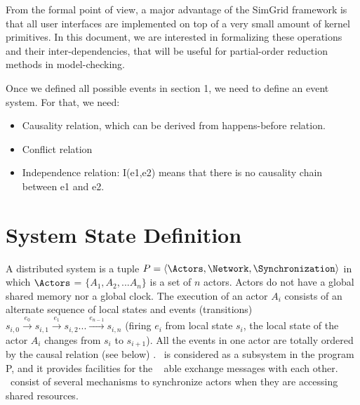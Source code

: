 \documentclass[a4paper,11pt]{article}
\newcommand{\TJ}[1]{\todo[color=green!50]{\sf \textbf{TJ:} #1}}
\begin{document}
From the formal point of view, a major advantage of the SimGrid framework is that all user interfaces are implemented on top of a very small amount of kernel primitives.
In this document, we are interested in formalizing these operations and their inter-dependencies, that will be useful for partial-order reduction methods  in model-checking.

Once we defined all possible events in section 1, we need to define an event system. For that, we need:
\begin{itemize}
\item Causality relation, which can be derived from happens-before relation.
\item Conflict relation
\item Independence relation: I(e1,e2) means that there is no causality chain between e1 and e2.
\end{itemize}

\section{System State Definition}
A distributed system is a tuple $P=\langle \Actors, \Network, \Synchronization \rangle$ in which  $\Actors$ = $\{ A_1, A_2, ... A_n\}$ is a set of $n$ actors. Actors do not have a global shared memory nor a global clock. The execution of an actor $A_i$ consists of an alternate sequence of local states and events (transitions)
$s_{i,0}\xrightarrow{\text{$e_0$}} s_{i,1} \xrightarrow{\text{$e_1$}}s_{i,2} ... \xrightarrow{\text{$e_{n-1}$}}s_{i,n}$ (firing $e_i$ from local state $s_{i}$, the local state of the actor $A_i$ changes from $s_i$ to $s_{i+1}$).
All the events in one actor are totally ordered by the causal relation (see below) \TJ{this will be discussed later ?}. \Network~is considered as a subsystem in the program P, and it provides facilities for the \Actors~ able exchange messages with each other. \Synchronization~consist of several mechanisms to synchronize actors when they are accessing shared resources. 
\end{document}
